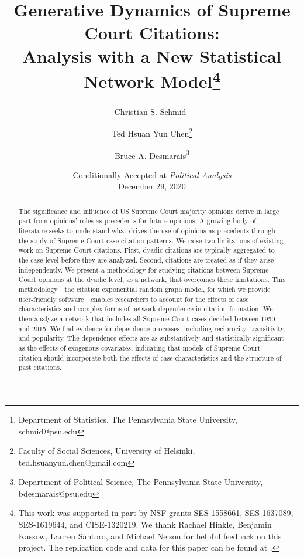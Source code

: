 \documentclass[headsepline=true, abstracton]{scrartcl}
\begin{document}
\renewcommand{\refname}{Bibliography}


\onehalfspacing
\setlength{\headsep}{15mm}


\thispagestyle{plain}

\title{\Large Generative Dynamics of Supreme Court Citations: \\ Analysis with a New Statistical Network Model\thanks{
		This work was supported in part by NSF grants SES-1558661, SES-1637089, SES-1619644, and CISE-1320219. We thank Rachael Hinkle, Benjamin Kassow, Lauren Santoro, and Michael Nelson for helpful feedback on this project. The replication code and data for this paper can be found at \citet{replicationdata}.}}


\author{%
  Christian S. Schmid\footnote{Department of Statistics, The Pennsylvania State University, schmid@psu.edu}%
  \and Ted Hsuan Yun Chen\footnote{Faculty of Social Sciences, University of Helsinki, ted.hsuanyun.chen@gmail.com}%
   \and Bruce A. Desmarais\footnote{Department of Political Science, The Pennsylvania State University, bdesmarais@psu.edu}%
  }

\date{Conditionally Accepted at \textit{Political Analysis}\\ December 29, 2020}


\maketitle
\begin{abstract}
\noindent The significance and influence of US Supreme Court majority opinions derive in large part from opinions' roles as precedents for future opinions. A growing body of literature seeks to understand what drives the use of opinions as precedents through the study of Supreme Court case citation patterns. We raise two limitations of existing work on Supreme Court citations. First, dyadic citations are typically aggregated to the case level before they are analyzed. Second, citations are treated as if they arise independently. We present a methodology for studying citations between Supreme Court opinions at the dyadic level, as a network, that overcomes these limitations. This methodology---the citation exponential random graph model, for which we provide user-friendly software---enables researchers to account for the effects of case characteristics and complex forms of network dependence in citation formation. We then analyze a network that includes all Supreme Court cases decided between 1950 and 2015. We find evidence for dependence processes, including reciprocity, transitivity, and popularity. The dependence effects are as substantively and statistically significant as the effects of exogenous covariates, indicating that models of Supreme Court citation should incorporate both the effects of case characteristics and the structure of past citations.
\end{abstract}
\end{document}
